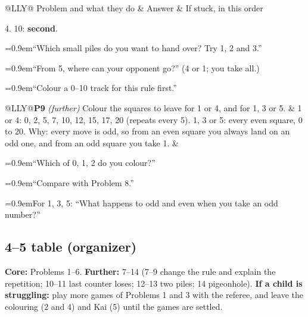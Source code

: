\documentclass[10pt]{article}
\makeatletter
\newcommand{\hd}{\rowcolor{head}}
\newlength{\cA}\newlength{\cB}
\newenvironment{probtable}[2]{\par\setlength{\cA}{#1}\setlength{\cB}{#2}%
  \setlength{\parskip}{0pt}\noindent
  \begin{tabularx}{\linewidth}{@{}L{\cA}L{\cB}Y@{}}\toprule
  \hd Problem and what they do & Answer & If stuck, in this order \\ \midrule
  \end{tabularx}\par\nopagebreak}{\par}
\newcommand{\prow}[3]{\noindent
  \begin{tabularx}{\linewidth}{@{}L{\cA}L{\cB}Y@{}}#1 & #2 & #3 \\ \midrule
  \end{tabularx}\par}
\newcommand{\hi}[1]{\par\noindent\hangindent=0.9em\hangafter=1\makebox[0.9em][l]{#1}}
\makeatother
\begin{document}
\begin{probtable}{1.7in}{2.45in}
{4. 10: \textbf{second}.}
{\hi{1}``Which small piles do you want to hand over? Try 1, 2 and 3.''
\hi{2}``From 5, where can your opponent go?'' (4 or 1; you take all.)
\hi{3}``Colour a 0--10 track for this rule first.''}
\prow{\textbf{P9} \textit{(further)} Colour the squares to leave for 1 or 4, and for 1, 3 or 5.}
{1 or 4: 0, 2, 5, 7, 10, 12, 15, 17, 20 (repeats every 5). 1, 3 or 5: every
even square, 0 to 20. Why: every move is odd, so from an even square you
always land on an odd one, and from an odd square you take 1.}
{\hi{1}``Which of 0, 1, 2 do you colour?''
\hi{2}``Compare with Problem 8.''
\hi{3}For 1, 3, 5: ``What happens to odd and even when you take an odd
number?''}
\end{probtable}

\subsection{4--5 table (organizer)}

\textbf{Core:} Problems 1--6. \textbf{Further:} 7--14 (7--9 change the rule and
explain the repetition; 10--11 last counter loses; 12--13 two piles; 14
pigeonhole). \textbf{If a child is struggling:} play more games of Problems 1
and 3 with the referee, and leave the colouring (2 and 4) and Kai (5) until
the games are settled.
\end{document}
